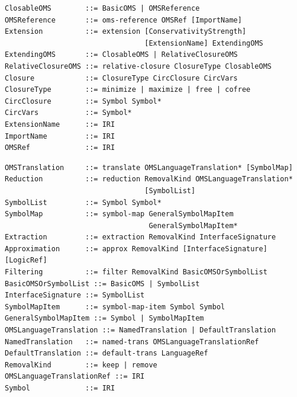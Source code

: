 \documentclass[10pt, a4paper]{isov2}
\newcommand*{\syntax}[1]{\texttt{#1}}
\begin{document}
\begin{lstlisting}[language=ebnf,escapeinside={()}]  % abstract syntax
ClosableOMS        ::= BasicOMS | OMSReference
OMSReference       ::= oms-reference OMSRef [ImportName]
Extension          ::= extension [ConservativityStrength]
                                 [ExtensionName] ExtendingOMS
ExtendingOMS       ::= ClosableOMS | RelativeClosureOMS
RelativeClosureOMS ::= relative-closure ClosureType ClosableOMS
Closure            ::= ClosureType CircClosure CircVars
ClosureType        ::= minimize | maximize | free | cofree
CircClosure        ::= Symbol Symbol*
CircVars           ::= Symbol*
ExtensionName      ::= IRI
ImportName         ::= IRI
OMSRef             ::= IRI
\end{lstlisting}


\begin{lstlisting}[language=ebnf,escapeinside={()}]  % abstract syntax
OMSTranslation     ::= translate OMSLanguageTranslation* [SymbolMap]
Reduction          ::= reduction RemovalKind OMSLanguageTranslation*
                                 [SymbolList]
SymbolList         ::= Symbol Symbol*
SymbolMap          ::= symbol-map GeneralSymbolMapItem
                                  GeneralSymbolMapItem*
Extraction         ::= extraction RemovalKind InterfaceSignature
Approximation      ::= approx RemovalKind [InterfaceSignature] [LogicRef]
Filtering          ::= filter RemovalKind BasicOMSOrSymbolList
BasicOMSOrSymbolList ::= BasicOMS | SymbolList
InterfaceSignature ::= SymbolList
SymbolMapItem      ::= symbol-map-item Symbol Symbol
GeneralSymbolMapItem ::= Symbol | SymbolMapItem
OMSLanguageTranslation ::= NamedTranslation | DefaultTranslation
NamedTranslation   ::= named-trans OMSLanguageTranslationRef
DefaultTranslation ::= default-trans LanguageRef
RemovalKind        ::= keep | remove
OMSLanguageTranslationRef ::= IRI
Symbol             ::= IRI
\end{lstlisting}
\end{document}
